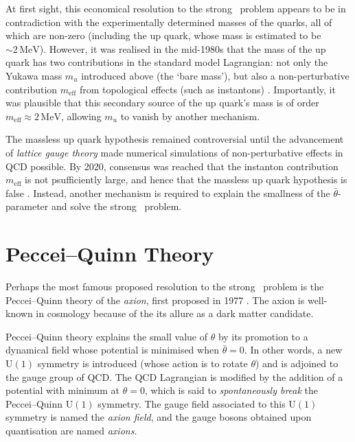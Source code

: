 At first sight, this economical resolution to the strong \CP\ problem appears to be in contradiction with the experimentally determined masses of the quarks, all of which are non-zero (including the up quark, whose mass is estimated to be $\sim 2\,\mathrm{MeV}$).
However, it was realised in the mid-1980s that the mass of the up quark has two contributions in the standard model Lagrangian: not only the Yukawa mass $m_u$ introduced above (the `bare mass'), but also a non-perturbative contribution $m_\text{eff}$ from topological effects (such as instantons) \cite{ruling-out-massless-uquark_2020}.
Importantly, it was plausible that this secondary source of the up quark's mass is of order $m_\text{eff} \approx 2\,\mathrm{MeV}$, allowing $m_u$ to vanish by another mechanism.

The massless up quark hypothesis remained controversial until the advancement of \emph{lattice gauge theory} made numerical simulations of non-perturbative effects in QCD possible.
By 2020, consensus was reached that the instanton contribution $m_\text{eff}$ is not psufficiently large, and hence that the massless up quark hypothesis is false \cite{ruling-out-massless-uquark_2015,aoki2016review,ruling-out-massless-uquark_2020}.
Instead, another mechanism is required to explain the smallness of the $\bar\theta$-parameter and solve the strong \CP\ problem.





\section{Peccei--Quinn Theory}

Perhaps the most famous proposed resolution to the strong \CP\ problem is the Peccei--Quinn theory of the \emph{axion}, first proposed in 1977 \cite{PecceiQuinn_1977}.
The axion is well-known in cosmology because of the its allure as a dark matter candidate.

Peccei--Quinn theory explains the small value of $\theta$ by its promotion to a dynamical field whose potential is minimised when $\bar\theta = 0$.
In other words, a new $\mathrm{U}(1)$ symmetry is introduced (whose action is to rotate $\theta$) and is adjoined to the gauge group of QCD.
The QCD Lagrangian is modified by the addition of a potential with minimum at $\theta = 0$, which is said to \emph{spontaneously break} the Peccei--Quinn $\mathrm{U}(1)$ symmetry.
The gauge field associated to this $\mathrm{U}(1)$ symmetry is named the \emph{axion field}, and the gauge bosons obtained upon quantisation are named \emph{axions}.

